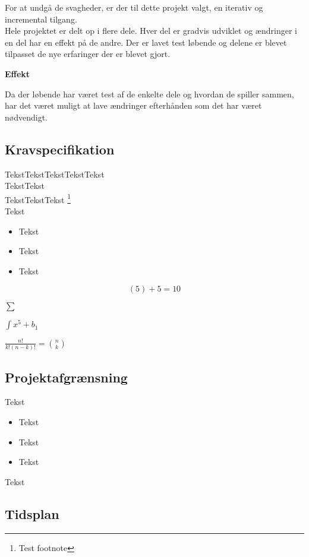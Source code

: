 For at undgå de svagheder, er der til dette projekt valgt, en iterativ og incremental tilgang.\\
Hele projektet er delt op i flere dele. Hver del er gradvis udviklet og ændringer i en del har en effekt på de andre. Der er lavet test løbende og delene er blevet tilpasset de nye erfaringer der er blevet gjort.


\textbf{Effekt}

Da der løbende har været test af de enkelte dele og hvordan de spiller sammen, har det været muligt at lave ændringer efterhånden som det har været nødvendigt. 



\subsection{Kravspecifikation}

TekstTekstTekstTekstTekst\\
TekstTekst\\
TekstTekstTekst \footnote{Test footnote}\\
Tekst

\begin{itemize}
	\item Tekst
	\item Tekst
	\item Tekst

\end{itemize}

\[(5)+5=10\]


$\displaystyle \sum$


$\displaystyle \int x^5+b_1$


$\frac{n!}{k!(n-k)!} = \binom{n}{k}$

\subsection{Projektafgrænsning}

Tekst

\begin{itemize}
	\item Tekst
	\item Tekst
	\item Tekst
\end{itemize}

Tekst


\subsection{Tidsplan}